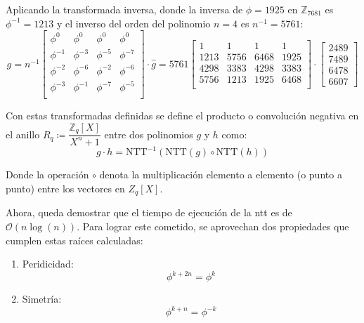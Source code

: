 Aplicando la transformada inversa, donde la inversa de $\phi=1925$ en \(\mathbb{Z}_{7681}\) es $\phi^{-1}=1213$ y el inverso del orden del polinomio \(n=4\) es \(n^{-1}=5761\):
\begin{equation}
	g=n^{-1}\begin{bmatrix}
		\phi^0 & \phi^0 & \phi^0 & \phi^0\\
		\phi^{-1} & \phi^{-3} & \phi^{-5} & \phi^{-7}\\
		\phi^{-2} & \phi^{-6} & \phi^{-2} & \phi^{-6}\\
		\phi^{-3} & \phi^{-1} & \phi^{-7} & \phi^{-5}\\
	\end{bmatrix} \cdot \hat{g}=5761\begin{bmatrix}
	1 & 1 & 1 & 1\\
	1213& 5756& 6468& 1925\\
	4298& 3383& 4298& 3383\\
	5756& 1213& 1925& 6468\\
	\end{bmatrix} \cdot \begin{bmatrix}
	2489\\
	7489\\
	6478\\
	6607 \end{bmatrix}
\end{equation}

Con estas transformadas definidas se define el producto o convolución negativa en el anillo \(	R_q \coloneqq \dfrac{\mathbb{Z}_q[X]}{X^n + 1}\) entre dos polinomios \(g\) y \(h\) como:
\begin{equation}
	g\cdot h= \text{NTT}^{-1}(\text{NTT}(g)\circ\text{NTT}(h))
\end{equation}

Donde la operación \(\circ\) denota la multiplicación elemento a elemento (o punto a punto) entre los vectores en ${Z}_q[X]$.
\newpage

Ahora, queda demostrar que el tiempo de ejecución de la \acrshort{ntt} es de \(\mathcal{O}(n \log(n))\). Para lograr este cometido, se aprovechan dos propiedades que cumplen estas raíces calculadas:
\begin{enumerate}
	\item Peridicidad: 
	\begin{equation}
		\phi^{k+2n}=\phi^k
	\end{equation}
	\item Simetría:
	\begin{equation}
		\phi^{k+n}=\phi^{-k}
	\end{equation}
\end{enumerate}

